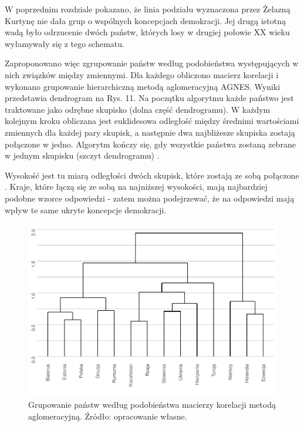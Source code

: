 \documentclass[12pt]{article}
\begin{document}
W poprzednim rozdziale pokazano, że linia podziału wyznaczona przez Żelazną Kurtynę nie dała grup o wspólnych koncepcjach demokracji. Jej drugą istotną wadą było odrzucenie dwóch państw, których losy w drugiej połowie XX wieku wyłamywały się z tego schematu.

Zaproponowano więc zgrupowanie państw według podobieństwa występujących w nich związków między zmiennymi. Dla każdego obliczono macierz korelacji i wykonano grupowanie hierarchiczną metodą aglomeracyjną AGNES. Wyniki przedstawia dendrogram na Rys. 11. Na początku algorytmu każde państwo jest traktowane jako odrębne skupisko (dolna część dendrogramu). W każdym kolejnym kroku obliczana jest euklidesowa odległość między średnimi wartościami zmiennych dla każdej pary skupisk, a następnie dwa najbliżesze skupiska zostają połączone w jedno. Algorytm kończy się, gdy wszystkie państwa zostaną zebrane w jednym skupisku (szczyt dendrogramu) \citep{Struyf}.

Wysokość jest tu miarą odległości dwóch skupisk, które zostają ze sobą połączone \citep{MaechRouss}. Kraje, które łączą się ze sobą na najniższej wysokości, mają najbardziej podobne wzorce odpowiedzi - zatem można podejrzewać, że na odpowiedzi mają wpływ te same ukryte koncepcje demokracji.

\begin{figure}

{\centering \includegraphics{text_ASA_files/figure-latex/dendrogram-1} 

}

\caption{Grupowanie państw według podobieństwa macierzy korelacji metodą aglomeracyjną. Źródło: opracowanie własne.}\label{fig:dendrogram}
\end{figure}
\end{document}
